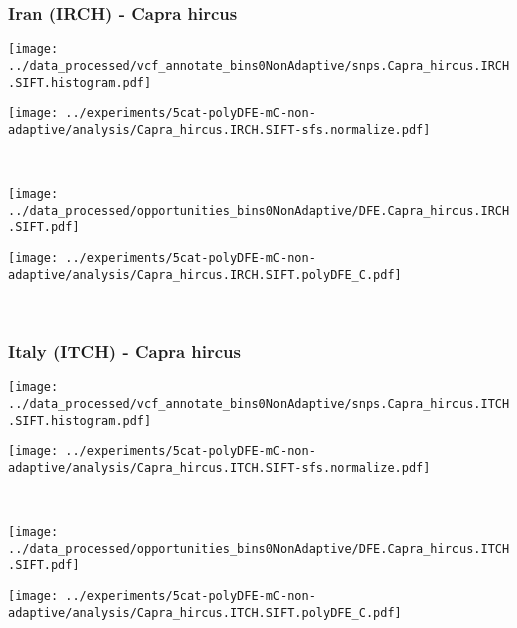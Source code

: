 \subsubsection{Iran (IRCH) - Capra hircus}

\begin{minipage}{0.49\linewidth}
    \texttt{[image: ../data\_processed/vcf\_annotate\_bins0NonAdaptive/snps.Capra\_hircus.IRCH.SIFT.histogram.pdf]}
\end{minipage}
\begin{minipage}{0.49\linewidth}
    \texttt{[image: ../experiments/5cat-polyDFE-mC-non-adaptive/analysis/Capra\_hircus.IRCH.SIFT-sfs.normalize.pdf]}
\end{minipage}
\\
\begin{minipage}{0.49\linewidth}
    \texttt{[image: ../data\_processed/opportunities\_bins0NonAdaptive/DFE.Capra\_hircus.IRCH.SIFT.pdf]}
\end{minipage}
\begin{minipage}{0.49\linewidth}
    \texttt{[image: ../experiments/5cat-polyDFE-mC-non-adaptive/analysis/Capra\_hircus.IRCH.SIFT.polyDFE\_C.pdf]}
\end{minipage}
\\

\subsubsection{Italy (ITCH) - Capra hircus}

\begin{minipage}{0.49\linewidth}
    \texttt{[image: ../data\_processed/vcf\_annotate\_bins0NonAdaptive/snps.Capra\_hircus.ITCH.SIFT.histogram.pdf]}
\end{minipage}
\begin{minipage}{0.49\linewidth}
    \texttt{[image: ../experiments/5cat-polyDFE-mC-non-adaptive/analysis/Capra\_hircus.ITCH.SIFT-sfs.normalize.pdf]}
\end{minipage}
\\
\begin{minipage}{0.49\linewidth}
    \texttt{[image: ../data\_processed/opportunities\_bins0NonAdaptive/DFE.Capra\_hircus.ITCH.SIFT.pdf]}
\end{minipage}
\begin{minipage}{0.49\linewidth}
    \texttt{[image: ../experiments/5cat-polyDFE-mC-non-adaptive/analysis/Capra\_hircus.ITCH.SIFT.polyDFE\_C.pdf]}
\end{minipage}
\\


